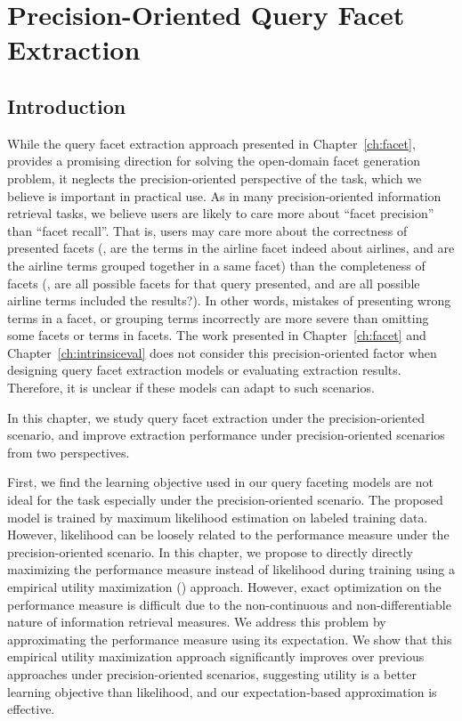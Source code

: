 \chapter{Precision-Oriented Query Facet Extraction}
\label{ch:precision}
\section{Introduction}
\label{sec:precision-intro}
While the query facet extraction approach presented in Chapter~\ref{ch:facet}, provides a promising direction for solving the open-domain facet generation problem, it neglects the precision-oriented perspective of the task, which we believe is important in practical use. As in many precision-oriented information retrieval tasks, we believe users are likely to care more about ``facet precision'' than ``facet recall''. That is, users may care more about the correctness of presented facets (\eg, are the terms in the airline facet indeed about airlines, and are the airline terms grouped together in a same facet) than the completeness of facets (\eg, are all possible facets for that query presented, and are all possible airline terms included the results?). In other words, mistakes of presenting wrong terms in a facet, or grouping terms incorrectly are more severe than omitting some facets or terms in facets. The work presented in Chapter~\ref{ch:facet} and Chapter~\ref{ch:intrinsiceval} does not consider 
this precision-oriented factor when designing query facet extraction models or evaluating 
extraction results. Therefore, it is unclear if these models can adapt to such scenarios.

In this chapter, we study query facet extraction under the precision-oriented scenario, and improve extraction performance under precision-oriented scenarios from two perspectives.

First, we find the learning objective used in our query faceting models are not ideal for the task especially under the precision-oriented scenario. The proposed model is trained by maximum likelihood estimation on labeled training data. However, likelihood can be loosely related to the performance measure under the precision-oriented scenario. In this chapter, we propose to directly directly maximizing the performance measure \PRF instead of likelihood during training using a empirical utility maximization (\EUM) approach. However, exact optimization on the performance measure is difficult due to the non-continuous and non-differentiable nature of information retrieval measures. We address this problem by approximating the performance measure using its expectation. We show that this empirical utility maximization approach significantly improves over previous approaches under precision-oriented scenarios, suggesting utility is a better learning objective than likelihood, and our expectation-based 
approximation is effective.  

